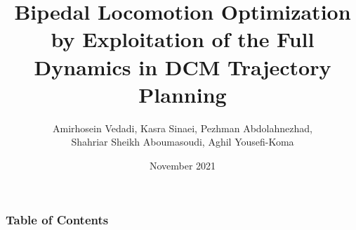 \documentclass[aspectratio=169,t,xcolor=table]{beamer}
\begin{document}
\title[Inf UFG]{Bipedal Locomotion Optimization by Exploitation of the
Full Dynamics in DCM Trajectory Planning}
\subtitle{}

\author{Amirhosein Vedadi, Kasra Sinaei, Pezhman Abdolahnezhad, \\
Shahriar Sheikh Aboumasoudi, Aghil Yousefi-Koma\\}
\date{November 2021}
\frame[noframenumbering]{\titlepage}



\begin{frame}
    \frametitle{Table of Contents}
    \tableofcontents
\end{frame}
\end{document}
